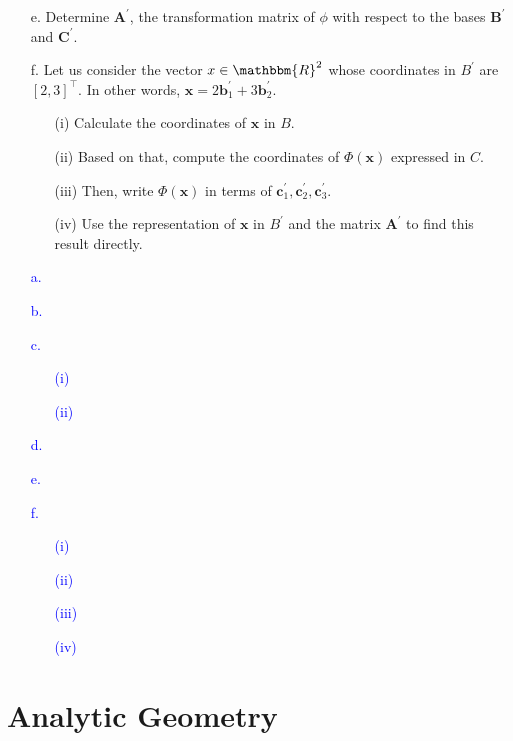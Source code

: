 \documentclass[a4paper,12pt]{article}
\newcommand{\R}{\mathbbm{R}}
\newcommand{\vecx}{\textbf{x}}
\newcommand{\vecb}{\textbf{b}}
\newcommand{\vecc}{\textbf{c}}
\newcommand{\matA}{\textbf{A}}
\newcommand{\pr}{^\prime}
\begin{document}
\begin{itemize}
 \item [e.]Determine $\matA\pr$, the transformation matrix of $\phi$ with respect to the bases $\textbf{B}\pr$ and $\textbf{C}\pr$.
 \item [f.] Let us consider the vector $x \in \R^2$ whose coordinates in $B\pr$ are $[2,3]^\top$. In other words, $\vecx = 2\vecb_1\pr +3\vecb_2\pr$.
 \begin{enumerate}
  \item [(i)] Calculate the coordinates of $\vecx$ in $B$.
  \item [(ii)] Based on that, compute the coordinates of $\Phi(\vecx)$ expressed in $C$.
  \item [(iii)] Then, write $\Phi(\vecx)$ in terms of $\vecc_1\pr, \vecc_2\pr, \vecc_3\pr$.
  \item [(iv)] Use the representation of $\vecx$ in $B\pr$ and the matrix $\matA\pr$ to find this result directly.
 \end{enumerate}
\end{itemize}
\textcolor{blue}{
\begin{itemize}
 \item [a.]
 \item [b.]
 \item [c.]
 \begin{enumerate}
  \item [(i)]
  \item [(ii)]
 \end{enumerate}
 \item [d.]
 \item [e.]
 \item[f.]
 \begin{enumerate}
  \item [(i)]
  \item [(ii)]
  \item [(iii)]
  \item [(iv)]
 \end{enumerate}
\end{itemize}
}

\newpage%
\section{Analytic Geometry}
\end{document}
